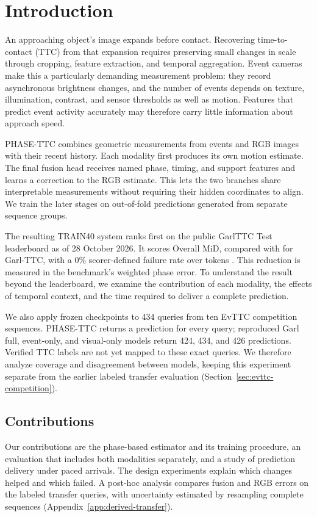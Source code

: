 \section{Introduction}
An approaching object's image expands before contact. Recovering time-to-contact (TTC) from that expansion requires preserving small changes in scale through cropping, feature extraction, and temporal aggregation. Event cameras make this a particularly demanding measurement problem: they record asynchronous brightness changes, and the number of events depends on texture, illumination, contrast, and sensor thresholds as well as motion. Features that predict event activity accurately may therefore carry little information about approach speed.

PHASE-TTC combines geometric measurements from events and RGB images with their recent history. Each modality first produces its own motion estimate. The final fusion head receives named phase, timing, and support features and learns a correction to the RGB estimate. This lets the two branches share interpretable measurements without requiring their hidden coordinates to align. We train the later stages on out-of-fold predictions generated from separate sequence groups. 

The resulting TRAIN40 system ranks first on the public GarlTTC Test leaderboard as of 28 October 2026. It scores \OfficialPhasePublishedOverallMiD{} Overall MiD, compared with \OfficialGarlOverallMiD{} for Garl-TTC, with a 0\% scorer-defined failure rate over \OfficialSampleCount{} tokens \citep{codabench2026}. This \OfficialOverallRelativeGain{} reduction is measured in the benchmark's weighted phase error. To understand the result beyond the leaderboard, we examine the contribution of each modality, the effects of temporal context, and the time required to deliver a complete prediction. 

We also apply frozen checkpoints to 434 queries from ten EvTTC competition sequences. PHASE-TTC returns a prediction for every query; reproduced Garl full, event-only, and visual-only models return 424, 434, and 426 predictions. Verified TTC labels are not yet mapped to these exact queries. We therefore analyze coverage and disagreement between models, keeping this experiment separate from the earlier labeled transfer evaluation (Section~\ref{sec:evttc-competition}). 

\subsection{Contributions}
Our contributions are the phase-based estimator and its training procedure, an evaluation that includes both modalities separately, and a study of prediction delivery under paced arrivals. The design experiments explain which changes helped and which failed. A post-hoc analysis compares fusion and RGB errors on the labeled transfer queries, with uncertainty estimated by resampling complete sequences (Appendix~\ref{app:derived-transfer}).

